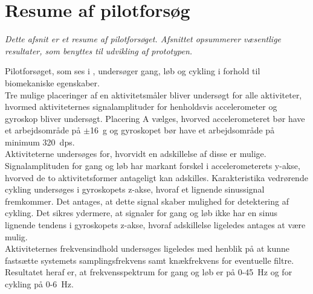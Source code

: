 \section{Resume af pilotforsøg}\label{opsamling_pilot}
\textit{Dette afsnit er et resume af pilotforsøget. Afsnittet opsummerer væsentlige resultater, som benyttes til udvikling af prototypen.}

Pilotforsøget, som ses i , undersøger gang, løb og cykling i forhold til biomekaniske egenskaber. \\
Tre mulige placeringer af en aktivitetsmåler bliver undersøgt for alle aktiviteter, hvormed aktiviteternes signalamplituder for henholdsvis accelerometer og gyroskop bliver undersøgt. Placering A vælges, hvorved accelerometeret bør have et arbejdsområde på $\pm$16~g og gyroskopet bør have et arbejdsområde på minimum 320~dps. \\
Aktiviteterne undersøges for, hvorvidt en adskillelse af disse er mulige. Signalamplituden for gang og løb har markant forskel i accelerometerets y-akse, hvorved de to aktivitetsformer antageligt kan adskilles. Karakteristika vedrørende cykling undersøges i gyroskopets z-akse, hvoraf et lignende sinussignal fremkommer. Det antages, at dette signal skaber mulighed for detektering af cykling. Det sikres ydermere, at signaler for gang og løb ikke har en sinus lignende tendens i gyroskopets z-akse, hvoraf adskillelse ligeledes antages at være mulig. \\
Aktiviteternes frekvensindhold undersøges ligeledes med henblik på at kunne fastsætte systemets samplingsfrekvens samt knækfrekvens for eventuelle filtre. Resultatet heraf er, at frekvensspektrum for gang og løb er på 0-45~Hz og for cykling på 0-6~Hz.

